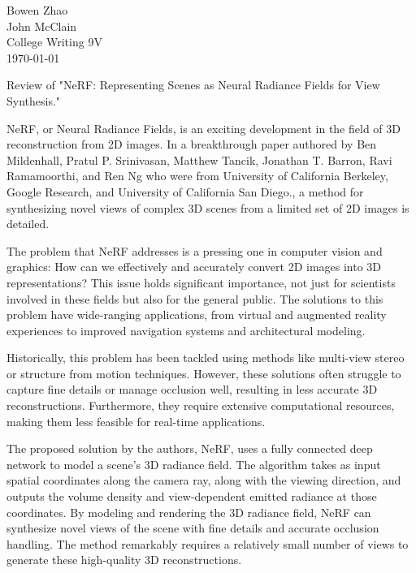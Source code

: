 \documentclass[12pt]{article}
\begin{document}
\begin{flushleft}

Bowen Zhao\\
John McClain\\
College Writing 9V\\
\today\\

\begin{center}
Review of "NeRF: Representing Scenes as Neural Radiance Fields for View Synthesis."
\end{center}

\setlength{\parindent}{0.5in}

NeRF, or Neural Radiance Fields, is an exciting development in the field of 3D reconstruction from 2D images. In a breakthrough paper authored by Ben Mildenhall, Pratul P. Srinivasan, Matthew Tancik, Jonathan T. Barron, Ravi Ramamoorthi, and Ren Ng who were  from University of California Berkeley, Google Research, and University of California San Diego., a method for synthesizing novel views of complex 3D scenes from a limited set of 2D images is detailed.

The problem that NeRF addresses is a pressing one in computer vision and graphics: How can we effectively and accurately convert 2D images into 3D representations? This issue holds significant importance, not just for scientists involved in these fields but also for the general public. The solutions to this problem have wide-ranging applications, from virtual and augmented reality experiences to improved navigation systems and architectural modeling.

Historically, this problem has been tackled using methods like multi-view stereo or structure from motion techniques. However, these solutions often struggle to capture fine details or manage occlusion well, resulting in less accurate 3D reconstructions. Furthermore, they require extensive computational resources, making them less feasible for real-time applications.

The proposed solution by the authors, NeRF, uses a fully connected deep network to model a scene's 3D radiance field. The algorithm takes as input spatial coordinates along the camera ray, along with the viewing direction, and outputs the volume density and view-dependent emitted radiance at those coordinates. By modeling and rendering the 3D radiance field, NeRF can synthesize novel views of the scene with fine details and accurate occlusion handling. The method remarkably requires a relatively small number of views to generate these high-quality 3D reconstructions.


\end{flushleft}
\end{document}
